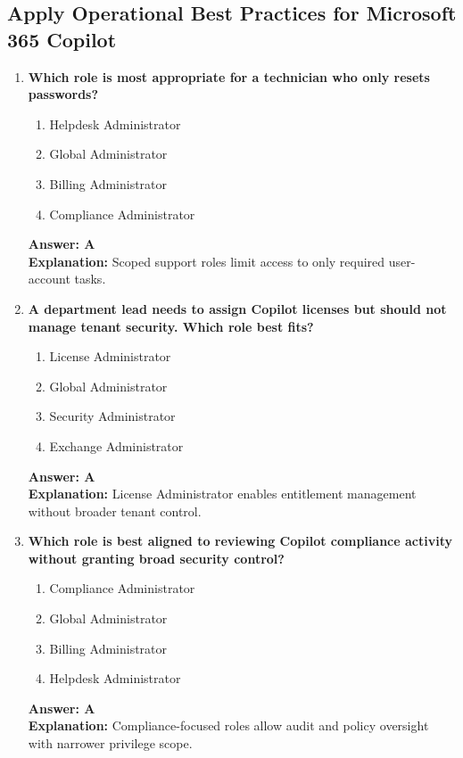 \documentclass[10pt]{article}
\begin{document}
\clearpage
\subsection{Apply Operational Best Practices for Microsoft 365 Copilot}
\begin{enumerate}[leftmargin=*]

\item \textbf{Which role is most appropriate for a technician who only resets passwords?}
\begin{enumerate}[label=\Alph*.]
  \item Helpdesk Administrator
  \item Global Administrator
  \item Billing Administrator
  \item Compliance Administrator
\end{enumerate}
\textbf{Answer: A}\\
\textbf{Explanation:} Scoped support roles limit access to only required user-account tasks.

\item \textbf{A department lead needs to assign Copilot licenses but should not manage tenant security. Which role best fits?}
\begin{enumerate}[label=\Alph*.]
  \item License Administrator
  \item Global Administrator
  \item Security Administrator
  \item Exchange Administrator
\end{enumerate}
\textbf{Answer: A}\\
\textbf{Explanation:} License Administrator enables entitlement management without broader tenant control.

\item \textbf{Which role is best aligned to reviewing Copilot compliance activity without granting broad security control?}
\begin{enumerate}[label=\Alph*.]
  \item Compliance Administrator
  \item Global Administrator
  \item Billing Administrator
  \item Helpdesk Administrator
\end{enumerate}
\textbf{Answer: A}\\
\textbf{Explanation:} Compliance-focused roles allow audit and policy oversight with narrower privilege scope.


\end{enumerate}
\end{document}
